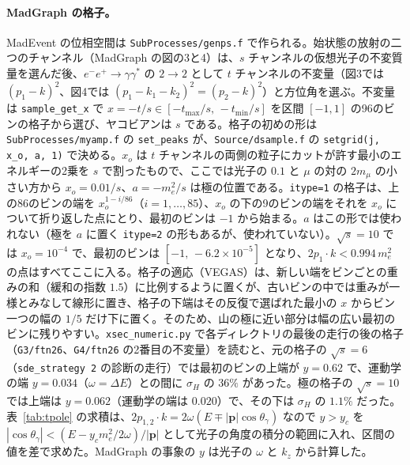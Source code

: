 \documentclass[a4paper,10pt]{ltjsarticle}
\begin{document}
\paragraph{MadGraph の格子。}MadEvent の位相空間は \texttt{SubProcesses/genps.f} で作られる。始状態の放射の二つのチャンネル（MadGraph の図の3と4）は、$s$ チャンネルの仮想光子の不変質量を選んだ後、$e^-e^+\to\gamma\gamma^*$ の $2\to2$ として $t$ チャンネルの不変量（図3では $(p_1-k)^2$、図4では $(p_1-k_1-k_2)^2=(p_2-k)^2$）と方位角を選ぶ。不変量は \texttt{sample\_get\_x} で $x=-t/s\in[-t_{\max}/s,\,-t_{\min}/s]$ を区間 $[-1,1]$ の96のビンの格子から選び、ヤコビアンは $s$ である。格子の初めの形は \texttt{SubProcesses/myamp.f} の \texttt{set\_peaks} が、\texttt{Source/dsample.f} の \texttt{setgrid(j, x\_o, a, 1)} で決める。$x_o$ は $t$ チャンネルの両側の粒子にカットが許す最小のエネルギーの2乗を $s$ で割ったもので、ここでは光子の $0.1$ と $\mu$ の対の $2m_\mu$ の小さい方から $x_o=0.01/s$、$a=-m_e^2/s$ は極の位置である。\texttt{itype=1} の格子は、上の86のビンの端を $x_o^{1-i/86}$（$i=1,\dots,85$）、$x_o$ の下の9のビンの端をそれを $x_o$ について折り返した点にとり、最初のビンは $-1$ から始まる。$a$ はこの形では使われない（極を $a$ に置く \texttt{itype=2} の形もあるが、使われていない）。$\sqrt s=10$ では $x_o=10^{-4}$ で、最初のビンは $[-1,\,-6.2\times10^{-5}]$ となり、$2p_1\cdot k<0.994\,m_e^2$ の点はすべてここに入る。格子の適応（VEGAS）は、新しい端をビンごとの重みの和（緩和の指数 $1.5$）に比例するように置くが、古いビンの中では重みが一様とみなして線形に置き、格子の下端はその反復で選ばれた最小の $x$ からビン一つの幅の $1/5$ だけ下に置く。そのため、山の極に近い部分は幅の広い最初のビンに残りやすい。\texttt{xsec\_numeric.py} で各ディレクトリの最後の走行の後の格子（\texttt{G3/ftn26}、\texttt{G4/ftn26} の2番目の不変量）を読むと、元の格子の $\sqrt s=6$（\texttt{sde\_strategy 2} の診断の走行）では最初のビンの上端が $y=0.62$ で、運動学の端 $y=0.034$（$\omega=\Delta E$）との間に $\sigma_H$ の $36\%$ があった。極の格子の $\sqrt s=10$ では上端は $y=0.062$（運動学の端は $0.020$）で、その下は $\sigma_H$ の $1.1\%$ だった。表~\ref{tab:tpole} の求積は、$2p_{1,2}\cdot k=2\omega(E\mp|\boldsymbol p|\cos\theta_\gamma)$ なので $y>y_c$ を $|\cos\theta_\gamma|<(E-y_cm_e^2/2\omega)/|\boldsymbol p|$ として光子の角度の積分の範囲に入れ、区間の値を差で求めた。MadGraph の事象の $y$ は光子の $\omega$ と $k_z$ から計算した。
\end{document}
